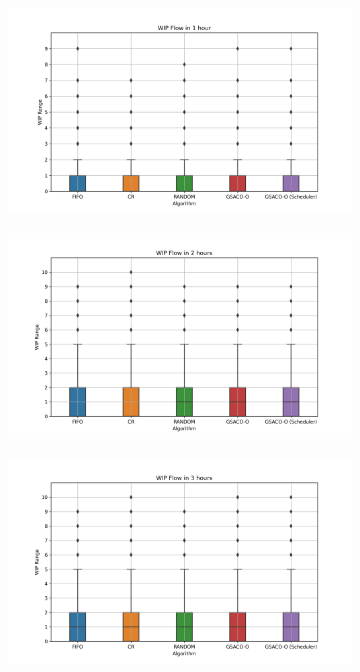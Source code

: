 \begin{figure}[t]
	\centering
	\begin{subfigure}{0.32\textwidth}
		\includegraphics[width=\textwidth]{LVHM/new_period_3600s.png}
	\end{subfigure}\hfill
	\begin{subfigure}{0.32\textwidth}
		\includegraphics[width=\textwidth]{LVHM/new_period_7200s.png}
	\end{subfigure}\hfill
	\begin{subfigure}{0.32\textwidth}
		\includegraphics[width=\textwidth]{LVHM/new_period_10800s.png}

\end{subfigure}
\end{figure}
